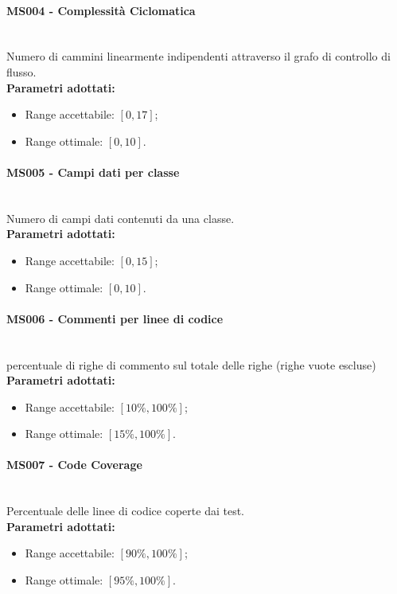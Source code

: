 \paragraph{MS004 - Complessità Ciclomatica}\mbox{}\\[0,3cm]
Numero di cammini linearmente indipendenti attraverso il grafo di controllo di flusso. \\[0,2cm]
\textbf{Parametri adottati:}
\begin{itemize}
	\item Range accettabile: $[0,17]$;
	\item Range ottimale: $[0,10]$.
\end{itemize}

\paragraph{MS005 - Campi dati per classe}\mbox{}\\[0,3cm]
Numero di campi dati contenuti da una classe. \\[0,2cm]
\textbf{Parametri adottati:}
\begin{itemize}
	\item Range accettabile: $[0,15]$;
	\item Range ottimale: $[0,10]$.
\end{itemize}

\paragraph{MS006 - Commenti per linee di codice}\mbox{}\\[0,3cm]
percentuale di righe di commento sul totale delle righe (righe vuote escluse) \\[0,2cm]
\textbf{Parametri adottati:}
\begin{itemize}
	\item Range accettabile: $[10\%,100\%]$;
	\item Range ottimale: $[15\%,100\%]$.
\end{itemize}

\paragraph{MS007 - Code Coverage}\mbox{}\\[0,3cm]
Percentuale delle linee di codice coperte dai test.\\[0,2cm]
\textbf{Parametri adottati:\newline}
\begin{itemize}
	\item Range accettabile: $[90\%,100\%]$;
	\item Range ottimale: $[95\%,100\%]$.
\end{itemize}
